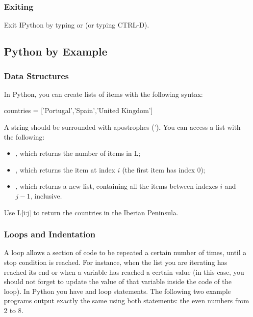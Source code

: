 \subsubsection{Exiting}

Exit IPython by typing  or  (or typing CTRL-D).

\subsection{Python by Example}


\subsubsection{Data Structures}

In Python, you can create lists of items with the following syntax:

\begin{python}
countries = ['Portugal','Spain','United Kingdom']
\end{python}

A string should be surrounded with apostrophes ('). You can access a list with
the following:

\begin{itemize}
 \item {}, which returns the number of items in L;
 \item {}, which returns the item at index $i$ (the first item has index 0);
 \item {}, which returns a new list, containing all the items between indexes $i$ and $j-1$, inclusive. 
\end{itemize}

\begin{exercise}
 Use L[i:j] to return the countries in the Iberian Peninsula.
\end{exercise}

\subsubsection{Loops and Indentation}

A loop allows a section of code to be repeated a certain number of times, until a stop condition is reached. For instance, when the list you are iterating has reached its end or when a variable has reached a certain value (in this case, you should not forget to update the value of that variable inside the code of the loop). In Python you have  and  loop statements. The following two example programs output exactly the same using both statements: the even numbers from 2 to 8.

